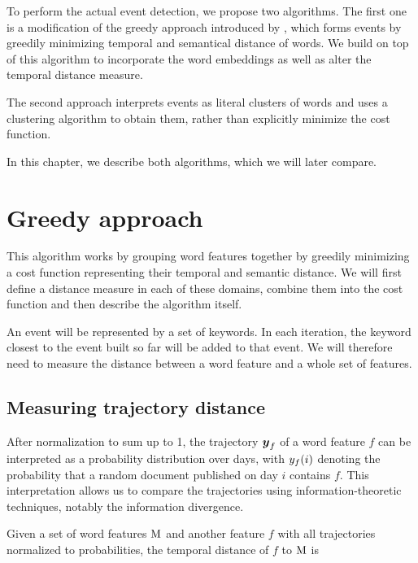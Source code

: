 
To perform the actual event detection, we propose two algorithms. The first one is a modification of the greedy approach introduced by \cite{event-detection}, which forms events by greedily minimizing temporal and semantical distance of words. We build on top of this algorithm to incorporate the word embeddings as well as alter the temporal distance measure.

The second approach interprets events as literal clusters of words and uses a clustering algorithm to obtain them, rather than explicitly minimize the cost function.

In this chapter, we describe both algorithms, which we will later compare.


\section{Greedy approach}
This algorithm works by grouping word features together by greedily minimizing a cost function representing their temporal and semantic distance. We will first define a distance measure in each of these domains, combine them into the cost function and then describe the algorithm itself.

An event will be represented by a set of keywords. In each iteration, the keyword closest to the event built so far will be added to that event. We will therefore need to measure the distance between a word feature and a whole set of features.

\subsection{Measuring trajectory distance}
After normalization to sum up to 1, the trajectory $\vect{\traj}_{f}$ of a word feature $f$ can be interpreted as a probability distribution over days, with $y_{f}(i)$ denoting the probability that a random document published on day $i$ contains $f$. This interpretation allows us to compare the trajectories using information-theoretic techniques, notably the information divergence.

Given a set of word features $\text{M}$ and another feature $f$ with all trajectories normalized to probabilities, the temporal distance of $f$ to $\text{M}$ is


